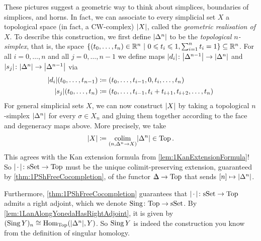 \begin{numpar}\label{par:GeometricRealisation}
	These pictures suggest a geometric way to think about simplices, boundaries of simplices, and horns. In fact, we can associate to every simplicial set $X$ a topological space (in fact, a CW-complex) $\abs*{X}$, called the \emph{geometric realisation of $X$}. To describe this construction, we first define $\abs*{\Delta^n}$ to be the \emph{topological $n$-simplex}, that is, the space $\{(t_0,\dotsc,t_n)\in\mathbb{R}^n\ |\ 0\leqslant t_i\leqslant 1, \sum_{i=1}^nt_i=1\}\subseteq \mathbb R^n$. For all $i=0,\dotsc,n$ and all $j=0,\dotsc,n-1$ we define maps $\abs*{d_i}\colon\abs*{\Delta^{n-1}}\rightarrow\abs*{\Delta^n}$ and $\abs*{s_j}\colon\abs*{\Delta^{n}}\rightarrow\abs*{\Delta^{n-1}}$ via
	\begin{align*}
		\abs*{d_i}(t_0,\dotsc,t_{n-1})&\coloneqq (t_0,\dotsc,t_{i-1},0,t_i,\dotsc,t_n)\\
		\abs*{s_j}(t_0,\dotsc,t_n)&\coloneqq (t_0,\dotsc,t_{i-1},t_i+t_{i+1},t_{i+2},\dotsc,t_n)
	\end{align*}
	For general simplicial sets $X$, we can now construct $\abs*{X}$ by taking a topological $n$-simplex $\abs*{\Delta^n}$ for every $\sigma\in X_n$ and gluing them together according to the face and degeneracy maps above. More precisely, we take
	\begin{equation*}
		\abs*{X}\coloneqq\colimit_{(n,\Delta^n\rightarrow X)}\abs*{\Delta^n}\in\cat{Top}\,.
	\end{equation*}
	This agrees with the Kan extension formula from \cref{lem:1KanExtensionFormula}! So $\abs*{\,\cdot\,}\colon \cat{sSet}\rightarrow \cat{Top}$ must be the unique colimit-preserving extension, guaranteed by \cref{thm:1PShFreeCocompletion}, of the functor $\IDelta\rightarrow\cat{Top}$ that sends $[n]\mapsto \abs*{\Delta^n}$.
	
	Furthermore, \cref{thm:1PShFreeCocompletion} guarantees that $\abs*{\,\cdot\,}\colon \cat{sSet}\rightarrow \cat{Top}$ admits a right adjoint, which we denote $\operatorname{Sing}\colon \mathrm{Top}\rightarrow\mathrm{sSet}$. By \cref{lem:1LanAlongYonedaHasRightAdjoint}, it is given by $(\Sing Y)_n\cong \Hom_{\cat{Top}}(\abs*{\Delta^n},Y)$. So $\operatorname{Sing} Y$ is indeed the construction you know from the definition of singular homology.
\end{numpar}
